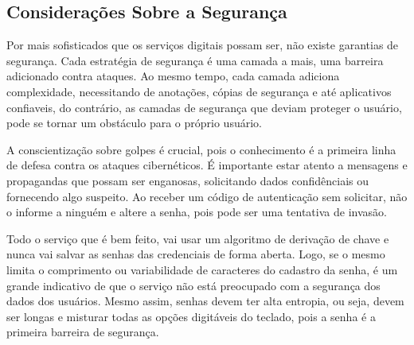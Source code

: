 \documentclass[12pt]{article}
\begin{document}
\subsection{Considerações Sobre a Segurança}

Por mais sofisticados que os serviços digitais possam ser, não existe garantias de segurança.
Cada estratégia de segurança é uma camada a mais, uma barreira adicionado contra ataques.
Ao mesmo tempo, cada camada adiciona complexidade, necessitando de anotações, cópias de
segurança e até aplicativos confiaveis, do contrário, as camadas de segurança que deviam
proteger o usuário, pode se tornar um obstáculo para o próprio usuário.

A conscientização sobre golpes é crucial, pois o conhecimento é a primeira linha de defesa contra
os ataques cibernéticos.
É importante estar atento a mensagens e propagandas que possam ser enganosas, solicitando dados
confidênciais ou fornecendo algo suspeito.
Ao receber um código de autenticação sem solicitar, não o informe a ninguém e altere a senha,
pois pode ser uma tentativa de invasão.

Todo o serviço que é bem feito, vai usar um algoritmo de derivação de chave e nunca vai salvar
as senhas das credenciais de forma aberta.
Logo, se o mesmo limita o comprimento ou variabilidade de caracteres do cadastro da senha, é um
grande indicativo de que o serviço não está preocupado com a segurança dos dados dos usuários.
Mesmo assim, senhas devem ter alta entropia, ou seja, devem ser longas e misturar todas as opções
digitáveis do teclado, pois a senha é a primeira barreira de segurança.



\end{document}
